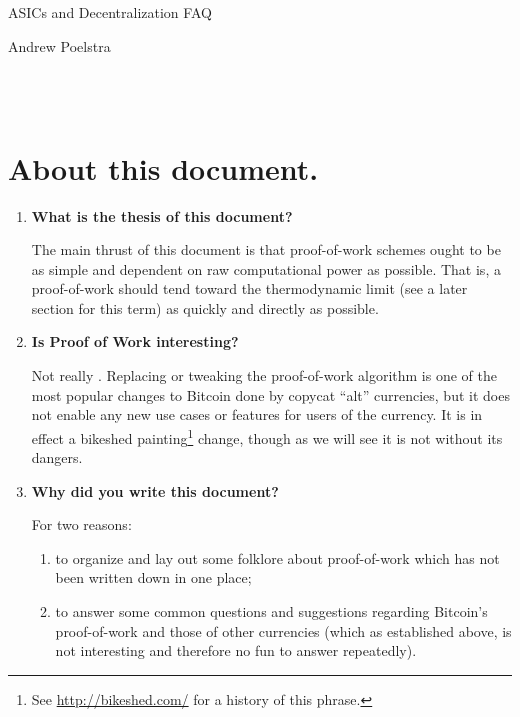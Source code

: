 \documentclass[letterpaper]{article}
\theoremstyle{xxx}
\theoremstyle{evil}
\theoremstyle{yyy}
\theoremstyle{plain}
\theoremstyle{zzz}
\begin{document}
\begin{minipage}[b]{0.7\linewidth}
{\huge ASICs and Decentralization FAQ}
\end{minipage}
\begin{minipage}[b]{0.3\linewidth}
  \begin{flushright}
    Andrew Poelstra\\
    \gitAuthorDate{}\\
    \texttt{\gitAbbrevHash}
  \end{flushright}
\end{minipage}
\\

\section{About this document.}
\begin{enumerate}
\item \textbf{What is the thesis of this document?}

The main thrust of this document is that proof-of-work schemes ought
to be as simple and dependent on raw computational power as possible.
That is, a proof-of-work should tend toward the thermodynamic limit
(see a later section for this term) as quickly and directly as possible.

\item \textbf{Is Proof of Work interesting?}

Not really \smiley. Replacing or tweaking the proof-of-work algorithm is one of the most popular changes to Bitcoin done
by copycat ``alt'' currencies, but it does not enable any new use cases
or features for users of the currency. It is in effect a bikeshed
painting\footnote{See \url{http://bikeshed.com/} for a history of this
phrase.} change, though as we will see it is not without its dangers.

\item \textbf{Why did you write this document?}

For two reasons:
\begin{enumerate}
\item to organize and lay out some folklore about proof-of-work which has
not been written down in one place;
\item to answer some common questions and suggestions regarding Bitcoin's
proof-of-work and those of other currencies (which as established above,
is not interesting and therefore no fun to answer repeatedly).
\end{enumerate}

\end{enumerate}
\end{document}
